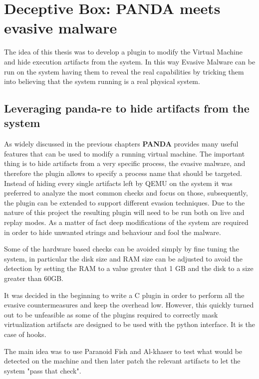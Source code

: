 \chapter{Deceptive Box: PANDA meets evasive malware}
\label{chap:4}

The idea of this thesis was to develop a plugin to modify the Virtual Machine and hide execution artifacts from the system. In this way Evasive Malware can be run on the system having them to reveal the real capabilities by tricking them into believing that the system running is a real physical system.

\section{Leveraging panda-re to hide artifacts from the system}

As widely discussed in the previous chapters \textbf{PANDA} provides many useful features that can be used to modify a running virtual machine. The important thing is to hide artifacts from a very specific process, the evasive malware, and therefore the plugin allows to specify a process name that should be targeted. Instead of hiding every single artifacts left by QEMU on the system it was preferred to analyze the most common checks and focus on those, subsequently, the plugin can be extended to support different evasion techniques. Due to the nature of this project the resulting plugin will need to be run both on live and replay modes. As a matter of fact deep modifications of the system are required in order to hide unwanted strings and behaviour and fool the malware.

Some of the hardware based checks can be avoided simply by fine tuning the system, in particular the disk size and RAM size can be adjusted to avoid the detection by setting the RAM to a value greater that 1 GB and the disk to a size greater than 60GB. 

It was decided in the beginning to write a C plugin in order to perform all the evasive countermeasures and keep the overhead low. However, this quickly turned out to be unfeasible as some of the plugins required to correctly mask virtualization artifacts are designed to be used with the python interface. It is the case of hooks.

The main idea was to use Paranoid Fish and Al-khaser to test what would be detected on the machine and then later patch the relevant artifacts to let the system "pass that check". 

